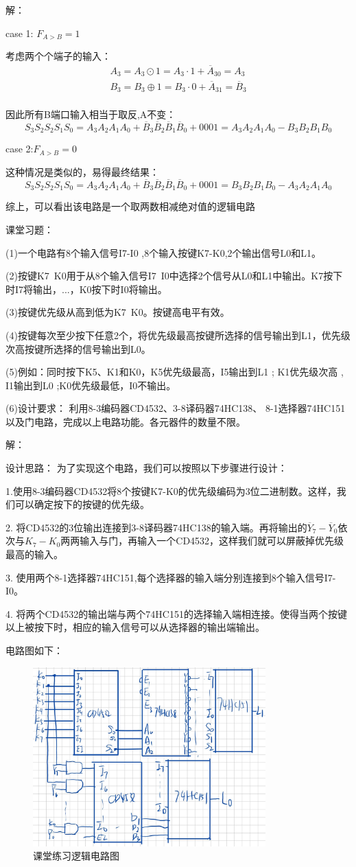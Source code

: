 \documentclass[a4paper,11pt,UTF8]{article}
\begin{document}
解：

case 1: $F_{A>B}=1$

考虑两个个端子的输入：
$$\begin{aligned}
	A_3=A_3\odot 1=A_3{\cdot}1+\overline{A}_30={A}_3\\
	B_3=B_3\oplus 1=B_3{\cdot}0+\overline{A}_31=\overline{B}_3\\
\end{aligned}
$$

因此所有B端口输入相当于取反,A不变：
$$
	S_3S_2S_2S_1S_0=A_3A_2A_1A_0+\overline{B}_3\overline{B}_2\overline{B}_1\overline{B}_0+0001=A_3A_2A_1A_0-B_3B_2B_1B_0
$$

case 2:$F_{A>B}=0$

这种情况是类似的，易得最终结果：
$$
S_3S_2S_2S_1S_0=A_3A_2A_1A_0+\overline{B}_3\overline{B}_2\overline{B}_1\overline{B}_0+0001=B_3B_2B_1B_0-A_3A_2A_1A_0
$$

综上，可以看出该电路是一个取两数相减绝对值的逻辑电路

\noindent 课堂习题：

(1)一个电路有8个输入信号I7-I0 ,8个输入按键K7-K0,2个输出信号L0和L1。

(2)按键K7~K0用于从8个输入信号I7~I0中选择2个信号从L0和L1中输出。K7按下时I7将输出，...，K0按下时I0将输出。

(3)按键优先级从高到低为K7~K0。按键高电平有效。

(4)按键每次至少按下任意2个，将优先级最高按键所选择的信号输出到L1，优先级次高按键所选择的信号输出到L0。

(5)例如：同时按下K5、K1和K0，K5优先级最高，I5输出到L1 ; K1优先级次高 , I1输出到L0 ;K0优先级最低，I0不输出。

(6)设计要求： 利用8-3编码器CD4532、3-8译码器74HC138、 8-1选择器74HC151以及门电路，完成以上电路功能。各元器件的数量不限。

\noindent 解：

\noindent 设计思路：
为了实现这个电路，我们可以按照以下步骤进行设计：

1.使用8-3编码器CD4532将8个按键K7-K0的优先级编码为3位二进制数。这样，我们可以确定按下的按键的优先级。

2. 将CD4532的3位输出连接到3-8译码器74HC138的输入端。再将输出的$\overline{Y}_7-\overline{Y}_0$依次与$K_7-K_0$两两输入与门，再输入一个CD4532，这样我们就可以屏蔽掉优先级最高的输入。

3. 使用两个8-1选择器74HC151,每个选择器的输入端分别连接到8个输入信号I7-I0。

4. 将两个CD4532的输出端与两个74HC151的选择输入端相连接。使得当两个按键以上被按下时，相应的输入信号可以从选择器的输出端输出。

电路图如下：
\begin{figure}[H]
	\centering
	\includegraphics[width=0.8\textwidth]{classtest}
	\caption{课堂练习逻辑电路图}
\end{figure}
\end{document}
